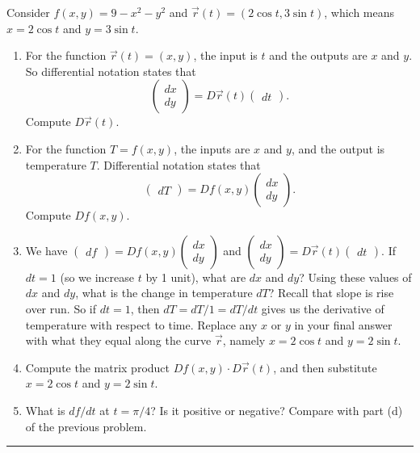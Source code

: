 \begin{problem}
 Consider $f(x,y)=9-x^2-y^2$ and $\vec r(t)=(2\cos t, 3\sin t)$, which means $x=2\cos t$ and $y=3\sin t$.
\begin{enumerate}
 \item{}%
For the function $\vec r(t)=(x,y)$, the input is $t$ and the outputs are $x$ and $y$.  So differential notation  states that 
$$\begin{pmatrix}dx\\dy\end{pmatrix}=D\vec r(t)\begin{pmatrix}dt\end{pmatrix}.$$
 Compute $D\vec r(t)$.
 \item For the function $T=f(x,y)$, the inputs are $x$ and $y$, and the output is temperature $T$. Differential notation  states that 
$$\begin{pmatrix}dT\end{pmatrix}=Df(x,y)\begin{pmatrix}dx\\dy\end{pmatrix}.$$
 Compute $Df(x,y)$.
 \item We have $\begin{pmatrix}df\end{pmatrix}=Df(x,y)\begin{pmatrix}dx\\dy\end{pmatrix}$ and $\begin{pmatrix}dx\\dy\end{pmatrix}=D\vec r(t)\begin{pmatrix}dt\end{pmatrix}.$ If $dt=1$ (so we increase $t$ by 1 unit), what are $dx$ and $dy$? Using these values of $dx$ and $dy$, what is the change in temperature $dT$? 
Recall that slope is rise over run.  So if $dt=1$, then $dT=dT/1=dT/dt$ gives us the derivative of temperature with respect to time. Replace any $x$ or $y$ in your final answer with what they equal along the curve $\vec r$, namely $x=2\cos t$ and $y=2\sin t$.
 \item Compute the matrix product $Df(x,y)\cdot D\vec r(t)$, and then substitute $x=2\cos t$ and $y=2\sin t$.
 \item What is $df/dt$ at $t=\pi/4$? Is it positive or negative? Compare with part (d) of the previous problem.
\end{enumerate}
\hrule\end{problem}

